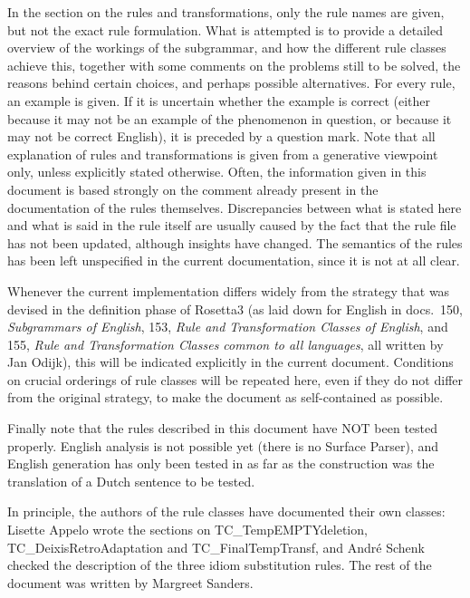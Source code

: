 In the section on the rules and transformations, only the rule names are given, 
but not the exact rule formulation. What is attempted 
is to provide a detailed overview of the workings of the subgrammar, and 
how the different rule classes achieve this,
together with some comments on the problems still to be solved, the reasons 
behind certain choices, and perhaps possible alternatives. For every rule, an 
example is given. If it is uncertain whether the example is correct (either 
because it may not be an example of the phenomenon in question, or because it 
may not be correct English), it is preceded by a question mark. Note that all 
explanation of rules and transformations is given from a generative viewpoint
only, unless explicitly stated otherwise. Often, the information given in this 
document is based strongly on the comment already present in the documentation 
of the rules themselves. Discrepancies between what is stated here and what is 
said in the rule itself are usually caused by the fact that the rule file has 
not  been updated, although insights have changed. The semantics of the rules 
has been left unspecified in the current documentation, since it is not at all 
clear.

Whenever the current implementation differs widely from the strategy that was 
devised in the definition phase of Rosetta3 (as laid down for English in docs.\ 
150, {\em Subgrammars of English\/}, 153, {\em Rule and Transformation Classes 
of English\/}, and 155, {\em Rule and Transformation Classes common to all 
languages\/}, all written by Jan Odijk), this will be indicated explicitly in 
the current document. Conditions on crucial orderings of rule classes will be 
repeated here, even if they do not differ from the original strategy, to make 
the document as self-contained as possible.

Finally note that the rules described in this document have NOT been tested 
properly. English analysis is not possible yet (there is no Surface Parser), and 
English generation has only been tested in as far as the construction was the 
translation of a Dutch sentence to be tested.

In principle, the authors of the rule classes have documented their own 
classes: Lisette Appelo wrote the sections on TC\_TempEMPTYdeletion, 
TC\_DeixisRetro\-Adap\-tation and TC\_FinalTempTransf, and Andr\'{e} 
Schenk checked the description of the three idiom substitution rules.
The rest of the document was written by Margreet Sanders.


\newpage
